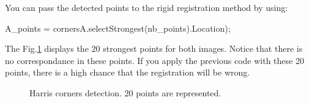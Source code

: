 You can pass the detected points to the rigid registration method by using:
\begin{matlab}
A_points = cornersA.selectStrongest(nb_points).Location);
\end{matlab}
The Fig.\ref{fig:registration:matlab:harris} displays the 20 strongest points for both images. Notice that there is no correspondance in these points. If you apply the previous code with these 20 points, there is a high chance that the registration will be wrong.

\begin{figure}[htbp]
\centering
 \hfill
 \caption{Harris corners detection. 20 points are represented.}
 \label{fig:registration:matlab:harris}
\end{figure}